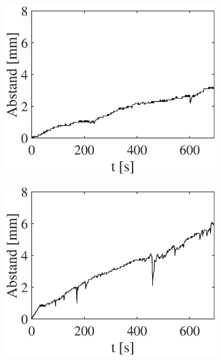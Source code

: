 \documentclass[doc,a4paper,12pt]{apa6}
\begin{document}
\begin{figure}
\begin{subfigure}[c]{0.23\textwidth}
    \label{img:bewegung:pa07:6}
  \end{subfigure}\vspace*{0.04\textwidth}
  \begin{subfigure}[c]{0.23\textwidth}
    \includegraphics[width=\textwidth]{ergebnisse/movement/pa10a1_mc_dist_movement.eps}
    \label{img:bewegung:pa10:1}
  \end{subfigure}\hspace*{0.02\textwidth}
  \begin{subfigure}[c]{0.23\textwidth}
    \includegraphics[width=\textwidth]{ergebnisse/movement/pa10a3_mc_dist_movement.eps}

\end{subfigure}
\end{figure}
\end{document}
